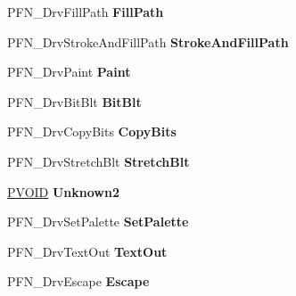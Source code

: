 \begin{DoxyCompactItemize}
P\+F\+N\+\_\+\+Drv\+Fill\+Path {\bfseries Fill\+Path}
\item 
\mbox{\label{struct___d_r_i_v_e_r___f_u_n_c_t_i_o_n_s_a7016e22b29f7f2c419e45f13b402aecb}} 
P\+F\+N\+\_\+\+Drv\+Stroke\+And\+Fill\+Path {\bfseries Stroke\+And\+Fill\+Path}
\item 
\mbox{\label{struct___d_r_i_v_e_r___f_u_n_c_t_i_o_n_s_a2af9b72459fd594341b582ab94f74ea1}} 
P\+F\+N\+\_\+\+Drv\+Paint {\bfseries Paint}
\item 
\mbox{\label{struct___d_r_i_v_e_r___f_u_n_c_t_i_o_n_s_a05a7da74ec17be06089b3aa6d21263b7}} 
P\+F\+N\+\_\+\+Drv\+Bit\+Blt {\bfseries Bit\+Blt}
\item 
\mbox{\label{struct___d_r_i_v_e_r___f_u_n_c_t_i_o_n_s_a3319b59ca4907a4c58e52483bec67565}} 
P\+F\+N\+\_\+\+Drv\+Copy\+Bits {\bfseries Copy\+Bits}
\item 
\mbox{\label{struct___d_r_i_v_e_r___f_u_n_c_t_i_o_n_s_af02a2461c44dd27899282e314d2175a5}} 
P\+F\+N\+\_\+\+Drv\+Stretch\+Blt {\bfseries Stretch\+Blt}
\item 
\mbox{\label{struct___d_r_i_v_e_r___f_u_n_c_t_i_o_n_s_aea5dff5b46ce546d6ab446da79b37ecd}} 
\hyperlink{interfacevoid}{P\+V\+O\+ID} {\bfseries Unknown2}
\item 
\mbox{\label{struct___d_r_i_v_e_r___f_u_n_c_t_i_o_n_s_af79ccdb2c59133913ba531e9fbfa4ac8}} 
P\+F\+N\+\_\+\+Drv\+Set\+Palette {\bfseries Set\+Palette}
\item 
\mbox{\label{struct___d_r_i_v_e_r___f_u_n_c_t_i_o_n_s_a290e8d32b6958f49dcf0694841f286b6}} 
P\+F\+N\+\_\+\+Drv\+Text\+Out {\bfseries Text\+Out}
\item 
\mbox{\label{struct___d_r_i_v_e_r___f_u_n_c_t_i_o_n_s_a031f4c76c1196abd0a0ef55770f84bb6}} 
P\+F\+N\+\_\+\+Drv\+Escape {\bfseries Escape}
\item 

\end{DoxyCompactItemize}
